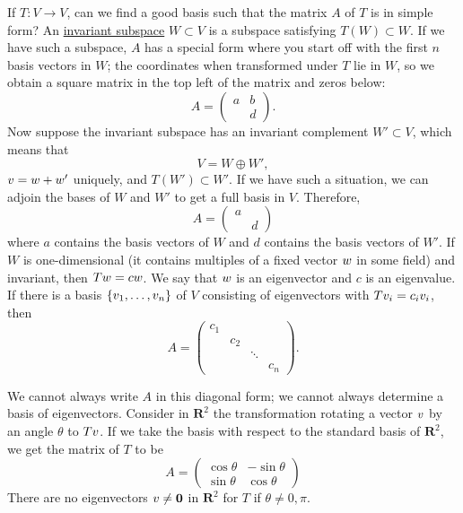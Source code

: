 \documentclass[11pt, oneside]{amsart}
\numberwithin{equation}{section}
\numberwithin{theorem}{section}
\theoremstyle{definition}
\let\bf\relax
\def\R{\mathbf{R}}
\def\0{\mathbf{0}}
\begin{document}
If $T:V\to V$, can we find a good basis such that the matrix $A$ of $T$ is in simple form? An \underline{invariant subspace} $W\subset V$ is a subspace satisfying $T(W)\subset W$. If we have such a subspace, $A$ has a special form where you start off with the first $n$ basis vectors in $W$; the coordinates when transformed under $T$ lie in $W$, so we obtain a square matrix in the top left of the matrix and zeros below:
$$
A = \begin{pmatrix} a & b\\  &d \end{pmatrix}.
$$
Now suppose the invariant subspace has an invariant complement $W'\subset V$, which means that
$$
V = W\oplus W',
$$
$\bf v = \bf w + \bf w'$ uniquely, and $T(W')\subset W'$. If we have such a situation, we can adjoin the bases of $W$ and $W'$ to get a full basis in $V$. Therefore,
$$
A = \begin{pmatrix} a & \\  &d \end{pmatrix}
$$
where $a$ contains the basis vectors of $W$ and $d$ contains the basis vectors of $W'$. If $W$ is one-dimensional (it contains multiples of a fixed vector $\bf w$ in some field) and invariant, then $T\bf w = c\bf w$. We say that $\bf w$ is an eigenvector and $c$ is an eigenvalue. If there is a basis $\{\bf v_1,\hdots, \bf v_n\}$ of $V$ consisting of eigenvectors with $T\bf{v}_i = c_i\bf v_i$, then
$$
A = \begin{pmatrix} c_1 & && \\ &c_2 && \\ &&\ddots & \\ &&&c_n \end{pmatrix}. 
$$

We cannot always write $A$ in this diagonal form; we cannot always determine a basis of eigenvectors. Consider in $\R^2$ the transformation rotating a vector $\bf v$ by an angle $\theta$ to $T\bf v$. If we take the basis with respect to the standard basis of $\R^2$, we get the matrix of $T$ to be 
$$
A = \begin{pmatrix} \cos \theta & -\sin \theta\\ \sin \theta &\cos \theta \end{pmatrix}
$$
There are no eigenvectors $\bf v \neq \0$ in $\R^2$ for $T$ if $\theta \neq 0,\pi$.
\end{document}

